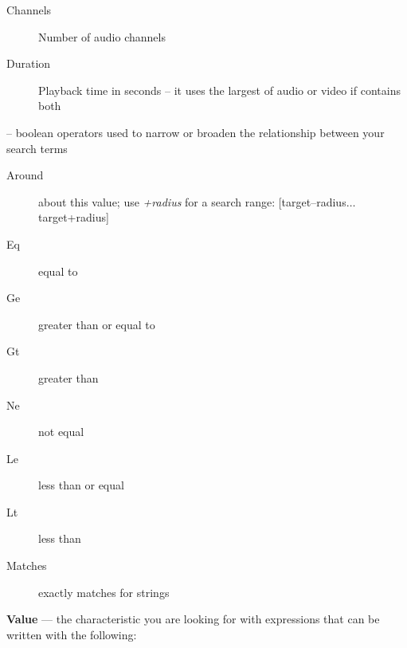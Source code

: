 \begin{description}
\begin{description}
                \item[Channels]	Number of audio channels
                \item[Duration]	Playback time in seconds -- it uses the largest of audio or video if contains both
    \end{description}
\item[\textcolor{CinBlueText}{Op}] – boolean operators used to narrow or broaden the relationship between your search terms
    \begin{description}
        \item[Around]	about this value; use \textit{+radius} for a search range: [target–radius$\dots$  target+radius]
        \item[Eq	]	equal to
        \item[Ge]	greater than or equal to
        \item[Gt]	greater than
        \item[Ne]not equal
        \item[Le]	less than or equal
        \item[Lt] less than
        \item[Matches]	exactly matches for strings
    \end{description}
\end{description}

\textbf{\textcolor{CinBlueText}{Value}} --- the characteristic you are looking for with expressions that can be written with the following:

